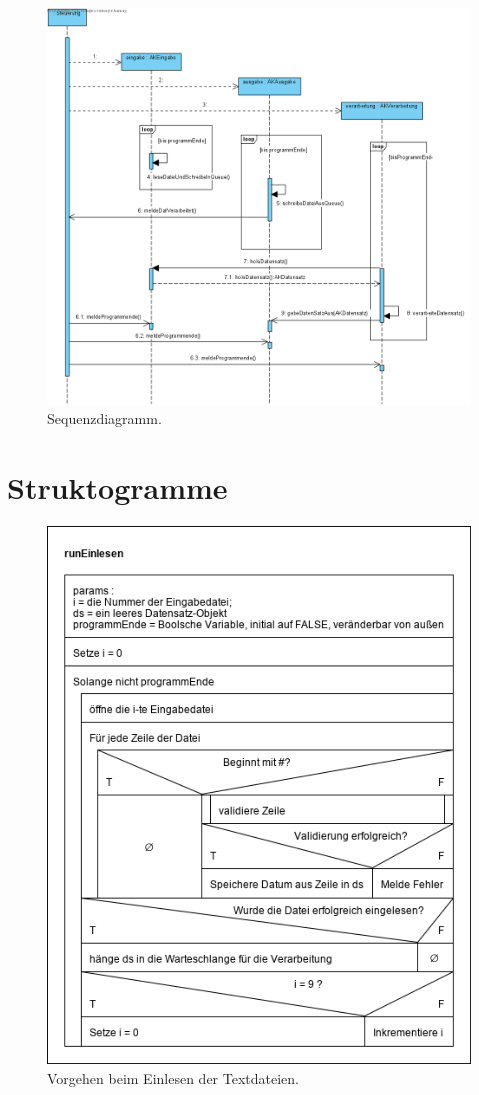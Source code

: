 \begin{figure}[htb]
    \centering
    \includegraphics[width=\linewidth]{images/sequenz}
    \caption{
        Sequenzdiagramm.
    }
    \label{fig:sequenz}
\end{figure}

\section{Struktogramme}\label{sec:strukto}

\begin{figure}[htb]
    \centering
    \includegraphics[width=0.8\linewidth]{images/runEinlesen}
    \caption{
        Vorgehen beim Einlesen der Textdateien.
    }
    \label{fig:run-einlesen}
\end{figure}

